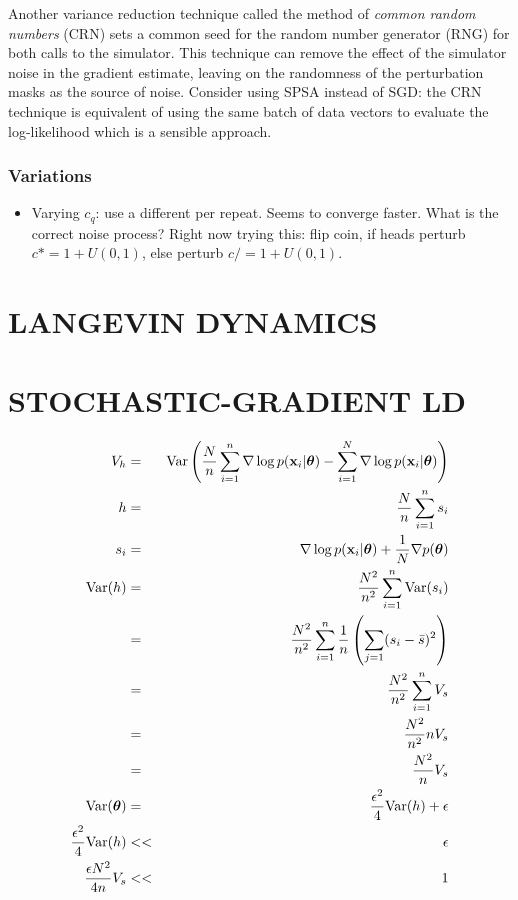 \documentclass[]{article}
\begin{document}
Another variance reduction technique called the method of {\em common random numbers} (CRN) \cite{kleinman1999} sets a common seed for the random number generator (RNG) for both calls to the simulator.  This technique can remove the effect of the simulator noise in the gradient estimate, leaving on the randomness of the perturbation masks as the source of noise. Consider using SPSA instead of SGD: the CRN technique is equivalent of using the same batch of data vectors to evaluate the log-likelihood which is a sensible approach.

\subsubsection{Variations}

\begin{itemize}
\item Varying $c_q$: use a different per repeat.  Seems to converge faster.  What is the correct noise process?  Right now trying this: flip coin, if heads perturb $c *= 1+U(0,1)$, else perturb $c /= 1 + U(0,1)$. 
\end{itemize}

\section{LANGEVIN DYNAMICS} \label{ld}


\section{STOCHASTIC-GRADIENT LD} \label{sgld}
\begin{eqnarray}
  V_h & = & \text{Var}\left( \frac{N}{n} \sum_{i=1}^n \nabla \log p({\bf x}_i | {\bm \theta}) - \sum_{i=1}^N \nabla \log p({\bf x}_i | {\bm \theta} )\right) \\
  h & = & \frac{N}{n} \sum_{i=1}^n s_i \\
  s_i & = & \nabla \log p({\bf x}_i | {\bm \theta}) + \frac{1}{N} \nabla p({\bm \theta}) \\
  \text{Var}(h) & = & \frac{N^2}{n^2} \sum_{i=1}^n \text{Var}(s_i) \\
                & = & \frac{N^2}{n^2} \sum_{i=1}^n \frac{1}{n} \left( \sum_{j=1} (s_i - \bar{s})^2 \right) \\
                & = & \frac{N^2}{n^2} \sum_{i=1}^n V_s \\
                & = & \frac{N^2}{n^2} n V_s \\
                & = & \frac{N^2}{n} V_s \\
  \text{Var}({\bm \theta}) & = & \frac{\epsilon^2}{4}\text{Var}(h) + \epsilon \\
         \frac{\epsilon^2}{4}\text{Var}(h) & << & \epsilon \\
         \frac{\epsilon N^2}{4 n} V_s & << & 1       
\end{eqnarray}
\end{document}
